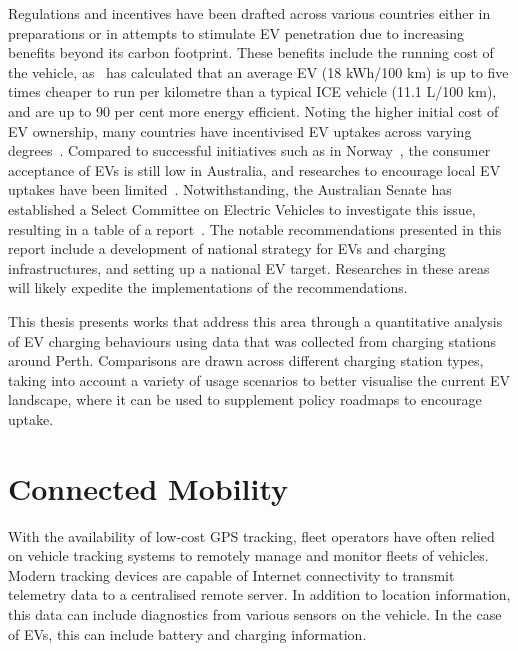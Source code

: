 Regulations and incentives have been drafted across various countries either in preparations or in attempts to stimulate EV penetration due to increasing benefits beyond its carbon footprint. These benefits include the running cost of the vehicle, as~\cite{joseph_how_2016} has calculated that an average EV (18 kWh/100 km) is up to five times cheaper to run per kilometre than a typical ICE vehicle (11.1 L/100 km), and are up to 90 per cent more energy efficient. Noting the higher initial cost of EV ownership, many countries have incentivised EV uptakes across varying degrees~\cite{broadbent_electric_2018}. Compared to successful initiatives such as in Norway~\cite{bauer_impact_2018}, the consumer acceptance of EVs is still low in Australia, and researches to encourage local EV uptakes have been limited~\cite{broadbent_analysis_2019}. Notwithstanding, the Australian Senate has established a Select Committee on Electric Vehicles to investigate this issue, resulting in a table of a report~\cite{senate_select_committee_on_electric_vehicles_report_2019}. The notable recommendations presented in this report include a development of national strategy for EVs and charging infrastructures, and setting up a national EV target. Researches in these areas will likely expedite the implementations of the recommendations. 


This thesis presents works that address this area through a quantitative analysis of EV charging behaviours using data that was collected from charging stations around Perth. Comparisons are drawn across different charging station types, taking into account a variety of usage scenarios to better visualise the current EV landscape, where it can be used to supplement policy roadmaps to encourage uptake.  


\section{Connected Mobility}
With the availability of low-cost GPS tracking, fleet operators have often relied on vehicle tracking systems to remotely manage and monitor fleets of vehicles. Modern tracking devices are capable of Internet connectivity to transmit telemetry data to a centralised remote server. In addition to location information, this data can include diagnostics from various sensors on the vehicle. In the case of EVs, this can include battery and charging information. 

